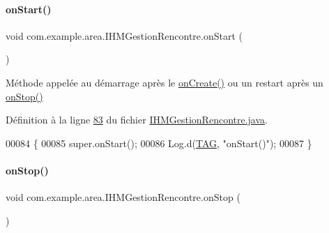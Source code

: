 \paragraph{\texorpdfstring{on\+Start()}{onStart()}}
{\footnotesize\ttfamily void com.\+example.\+area.\+I\+H\+M\+Gestion\+Rencontre.\+on\+Start (\begin{DoxyParamCaption}{ }\end{DoxyParamCaption})\hspace{0.3cm}{\ttfamily [protected]}}



Méthode appelée au démarrage après le \hyperlink{classcom_1_1example_1_1area_1_1_i_h_m_gestion_rencontre_a233405b574407eda9ba407dd706fef91}{on\+Create()} ou un restart après un \hyperlink{classcom_1_1example_1_1area_1_1_i_h_m_gestion_rencontre_abfee40a2616713d70c0245ae72c6d794}{on\+Stop()} 



Définition à la ligne \hyperlink{_i_h_m_gestion_rencontre_8java_source_l00083}{83} du fichier \hyperlink{_i_h_m_gestion_rencontre_8java_source}{I\+H\+M\+Gestion\+Rencontre.\+java}.


\begin{DoxyCode}
00084     \{
00085         super.onStart();
00086         Log.d(\hyperlink{classcom_1_1example_1_1area_1_1_i_h_m_gestion_rencontre_a0ac4d9152d48619cd697c8c69166219f}{TAG}, \textcolor{stringliteral}{"onStart()"});
00087     \}
\end{DoxyCode}
\mbox{\label{classcom_1_1example_1_1area_1_1_i_h_m_gestion_rencontre_abfee40a2616713d70c0245ae72c6d794}} 
\paragraph{\texorpdfstring{on\+Stop()}{onStop()}}
{\footnotesize\ttfamily void com.\+example.\+area.\+I\+H\+M\+Gestion\+Rencontre.\+on\+Stop (\begin{DoxyParamCaption}{ }\end{DoxyParamCaption})\hspace{0.3cm}{\ttfamily [protected]}}



